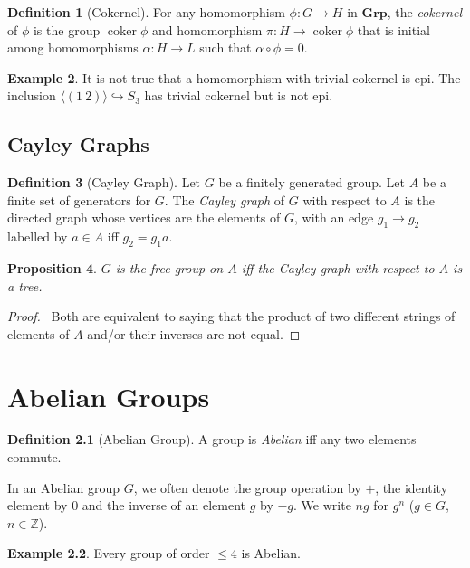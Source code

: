 \documentclass{book}
\let\qed\relax
\newtheorem{prop}{Proposition}[chapter]
\theoremstyle{definition}
\newtheorem{df}[prop]{Definition}
\newtheorem{ex}[prop]{Example}
\newcommand{\coker}{\ensuremath{\operatorname{coker}}}
\begin{document}
\begin{df}[Cokernel]
For any homomorphism $\phi : G \rightarrow H$ in $\mathbf{Grp}$, the \emph{cokernel} of $\phi$ is the group $\coker \phi$ and homomorphism $\pi : H \rightarrow \coker \phi$ that is initial among homomorphisms $\alpha : H \rightarrow L$ such that $\alpha \circ \phi = 0$.
\end{df}

\begin{ex}
It is not true that a homomorphism with trivial cokernel is epi. The inclusion $\langle (1\ 2) \rangle \hookrightarrow S_3$ has trivial cokernel but is not epi.
\end{ex}

\section{Cayley Graphs}

\begin{df}[Cayley Graph]
Let $G$ be a finitely generated group. Let $A$ be a finite set of generators for $G$. The \emph{Cayley graph} of $G$ with respect to $A$ is the directed graph whose vertices are the elements of $G$, with an edge $g_1 \rightarrow g_2$ labelled by $a \in A$ iff $g_2 = g_1 a$.
\end{df}

\begin{prop}
$G$ is the free group on $A$ iff the Cayley graph with respect to $A$ is a tree.
\end{prop}

\begin{proof}
\pf\ Both are equivalent to saying that the product of two different strings of elements of $A$ and/or their inverses are not equal. \qed
\end{proof}

\chapter{Abelian Groups}

\begin{df}[Abelian Group]
    A group is \emph{Abelian} iff any two elements commute.
\end{df}

In an Abelian group $G$, we often denote the group operation by $+$, the
identity element by $0$ and the inverse of an element $g$ by $-g$. We write
$ng$ for $g^n$ ($g \in G$, $n \in \mathbb{Z}$).

\begin{ex}
    Every group of order $\leq 4$ is Abelian.
\end{ex}
\end{document}
